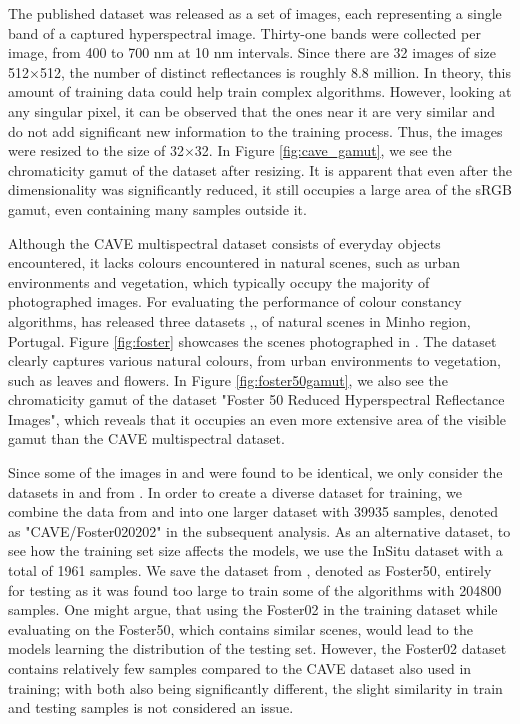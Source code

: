 The published dataset was released as a set of images, each representing a single band of a captured hyperspectral image. Thirty-one bands were collected per image, from 400 to 700 nm at 10 nm intervals. Since there are 32 images of size 512$\times$512, the number of distinct reflectances is roughly 8.8 million. In theory, this amount of training data could help train complex algorithms. However, looking at any singular pixel, it can be observed that the ones near it are very similar and do not add significant new information to the training process. Thus, the images were resized to the size of 32$\times$32. In Figure \ref{fig:cave_gamut}, we see the chromaticity gamut of the dataset after resizing. It is apparent that even after the dimensionality was significantly reduced, it still occupies a large area of the sRGB gamut, even containing many samples outside it.

Although the CAVE multispectral dataset consists of everyday objects encountered, it lacks colours encountered in natural scenes, such as urban environments and vegetation, which typically occupy the majority of photographed images. For evaluating the performance of colour constancy algorithms, \citeauthor{Foster:06} has released three datasets \cite{Foster:06},\cite{Foster2022}, \cite{foster:2002} of natural scenes in Minho region, Portugal. Figure \ref{fig:foster} showcases the scenes photographed in \cite{Foster2022}. The dataset clearly captures various natural colours, from urban environments to vegetation, such as leaves and flowers. In Figure \ref{fig:foster50gamut}, we also see the chromaticity gamut of the dataset "Foster 50 Reduced Hyperspectral Reflectance
Images", which reveals that it occupies an even more extensive area of the visible gamut than the CAVE multispectral dataset.

Since some of the images in \cite{Foster:06} and \cite{Foster2022} were found to be identical, we only consider the datasets in \cite{foster:2002} and \cite{Foster2022} from \citeauthor{Foster2022}. In order to create a diverse dataset for training, we combine the data from \cite{CAVE_0293} and \cite{foster:2002} into one larger dataset with 39935 samples, denoted as "CAVE/Foster020202"  in the subsequent analysis. As an alternative dataset, to see how the training set size affects the models, we use the InSitu dataset with a total of 1961 samples. We save the dataset from \cite{Foster2022}, denoted as Foster50, entirely for testing as it was found too large to train some of the algorithms with 204800 samples. One might argue, that using the Foster02 in the training dataset while evaluating on the Foster50, which contains similar scenes, would lead to the models learning the distribution of the testing set. However, the Foster02 dataset contains relatively few samples compared to the CAVE dataset also used in training; with both also being significantly different, the slight similarity in train and testing samples is not considered an issue.


